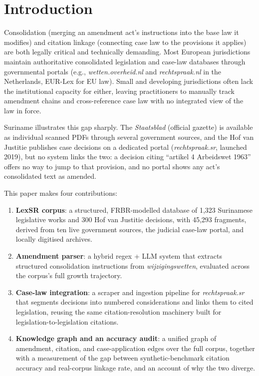 \documentclass{IOS-Book-Article}
\begin{document}
\section{Introduction}

Consolidation (merging an amendment act's instructions into the base law it modifies) and
citation linkage (connecting case law to the provisions it applies) are both legally
critical and technically demanding. Most European jurisdictions maintain authoritative
consolidated legislation and case-law databases through governmental portals (e.g.,
\emph{wetten.overheid.nl} and \emph{rechtspraak.nl} in the Netherlands, EUR-Lex for EU law). Small and
developing jurisdictions often lack the institutional capacity for either, leaving
practitioners to manually track amendment chains and cross-reference case law with no
integrated view of the law in force.

Suriname illustrates this gap sharply. The \emph{Staatsblad} (official gazette) is available as
individual scanned PDFs through several government sources, and the Hof van Justitie
publishes case decisions on a dedicated portal (\emph{rechtspraak.sr}, launched 2019), but no
system links the two: a decision citing ``artikel 4 Arbeidswet 1963'' offers no way to jump to
that provision, and no portal shows any act's consolidated text as amended.

This paper makes four contributions:

\begin{enumerate}
\item \textbf{LexSR corpus}: a structured, FRBR-modelled database of 1,323 Surinamese legislative
   works and 300 Hof van Justitie decisions, with 45,293 fragments, derived from ten live
   government sources, the judicial case-law portal, and locally digitised archives.
\item \textbf{Amendment parser}: a hybrid regex + LLM system that extracts structured consolidation
   instructions from \emph{wijzigingswetten}, evaluated across the corpus's full growth trajectory.
\item \textbf{Case-law integration}: a scraper and ingestion pipeline for \emph{rechtspraak.sr} that
   segments decisions into numbered considerations and links them to cited legislation,
   reusing the same citation-resolution machinery built for legislation-to-legislation
   citations.
\item \textbf{Knowledge graph and an accuracy audit}: a unified graph of amendment, citation,
   and case-application edges over the full corpus, together with a measurement of the gap
   between synthetic-benchmark citation accuracy and real-corpus linkage rate, and an
   account of why the two diverge.
\end{enumerate}
\end{document}
